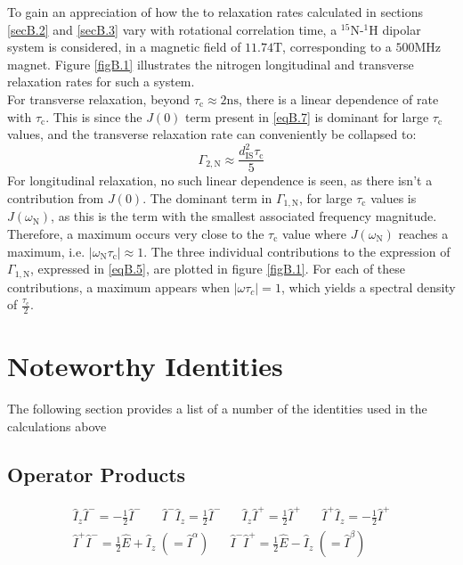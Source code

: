 \begin{appendixtext}
To gain an appreciation of how the to relaxation rates calculated in sections \ref{secB.2} and \ref{secB.3} vary with rotational correlation time, a $^{15}$N-$^{1}$H dipolar system is considered, in a magnetic field of $\num{11.74} \si{\tesla}$, corresponding to a $\num{500} \si{\mega \hertz}$ magnet. Figure \ref{figB.1} illustrates the nitrogen longitudinal and transverse relaxation rates for such a system. \\
For transverse relaxation, beyond $\tau_{\text{c}} \approx 2 \si{\nano\second}$, there is a linear dependence of rate with $\tau_{\text{c}}$. This is since the $J(0)$ term present in \ref{eqB.7} is dominant for large $\tau_{\text{c}}$ values, and the transverse relaxation rate can conveniently be collapsed to:
\begin{equation}
\Gamma_{2,\text{N}} \approx \frac{d_{\text{IS}}^2 \tau_{\text{c}}}{5}  
\end{equation}
For longitudinal relaxation, no such linear dependence is seen, as there isn't a contribution from $J(0)$. The dominant term in $\Gamma_{1,\text{N}}$, for large $\tau_{\text{c}}$ values is $J(\omega_{\text{N}})$, as this is the term with the smallest associated frequency magnitude. Therefore, a maximum occurs very close to the $\tau_{\text{c}}$ value where $J(\omega_{\text{N}})$ reaches a maximum, i.e. $|\omega_{\text{N}} \tau_{\text{c}}| \approx 1$. The three individual contributions to the expression of $\Gamma_{1,\text{N}}$, expressed in \ref{eqB.5}, are plotted in figure \ref{figB.1}. For each of these contributions, a maximum appears when $|\omega \tau_{c}| = 1$, which yields a spectral density of $\frac{\tau_{\text{c}}}{2}$.
\section{Noteworthy Identities}
The following section provides a list of a number of the identities used in the calculations above
\subsection{Operator Products}
\begin{equation*}
\begin{gathered}
\hat{I}_z \hat{I}^- = -\frac{1}{2} \hat{I}^- \hspace{20pt} \hat{I}^- \hat{I}_z = \frac{1}{2} \hat{I}^- \hspace{20pt} \hat{I}_z \hat{I}^+ = \frac{1}{2} \hat{I}^+ \hspace{20pt} \hat{I}^+ \hat{I}_z = -\frac{1}{2} \hat{I}^+ \\
\hat{I}^+ \hat{I}^- = \frac{1}{2} \hat{E} + \hat{I}_z \hspace{3pt} (= \hat{I}^{\alpha}) \hspace{20pt} \hat{I}^- \hat{I}^+ = \frac{1}{2} \hat{E} - \hat{I}_z \hspace{3pt} (= \hat{I}^{\beta})
\end{gathered}
\end{equation*}

\end{appendixtext}
